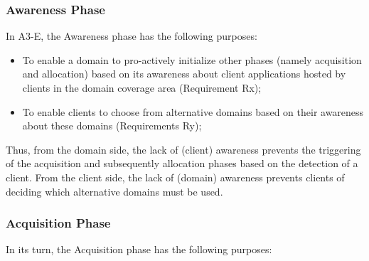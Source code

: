 \subsubsection{Awareness Phase}\label{sec:A3-E-awareness}


In A3-E, the Awareness phase has the following purposes:

\begin{itemize}
	
	\item To enable a domain to pro-actively initialize other phases (namely acquisition and allocation) based on its awareness about client applications hosted by clients in the domain coverage area (Requirement Rx);
	
	\item To enable clients to choose from alternative domains based on their awareness about these domains (Requirements Ry); 
	
\end{itemize}

Thus, from the domain side, the lack of (client) awareness prevents the triggering of the acquisition and subsequently allocation phases based on the detection of a client. From the client side, the lack of (domain) awareness prevents clients of deciding which alternative domains must be used. 

\subsubsection{Acquisition Phase}\label{sec:A3-E-acquisition}

In its turn, the Acquisition phase has the following purposes:

